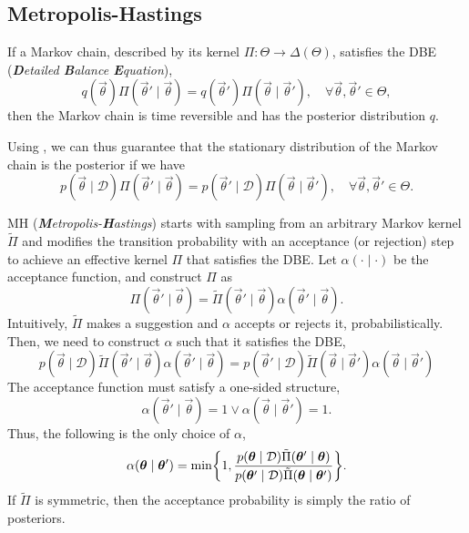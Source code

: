 \subsection{Metropolis-Hastings}

\begin{lemma} \label{lem:dbe}
    If a Markov chain, described by its kernel $\Pi: \Theta \to \Delta(\Theta)$, satisfies the DBE (\textit{\textbf{D}etailed \textbf{B}alance \textbf{E}quation}), \[
        q(\vec{\theta}) \Pi(\vec{\theta}' \mid \vec{\theta}) = q(\vec{\theta}') \Pi(\vec{\theta} \mid \vec{\theta}'), \quad \forall \vec{\theta}, \vec{\theta}' \in \Theta,
    \]
    then the Markov chain is time reversible and has the posterior distribution $q$.
\end{lemma}

Using , we can thus guarantee that the stationary distribution of the Markov chain is
the posterior if we have \[
    p(\vec{\theta} \mid \mathcal{D}) \Pi(\vec{\theta}' \mid \vec{\theta}) = p(\vec{\theta}' \mid \mathcal{D}) \Pi(\vec{\theta} \mid \vec{\theta}'), \quad \forall \vec{\theta}, \vec{\theta}' \in \Theta.
\]

MH (\textit{\textbf{M}etropolis-\textbf{H}astings}) starts with sampling from an arbitrary Markov
kernel $\tilde{\Pi}$ and modifies the transition probability with an acceptance (or rejection) step
to achieve an effective kernel $\Pi$ that satisfies the DBE. Let $\alpha(\cdot \mid \cdot)$ be the
acceptance function, and construct $\Pi$ as \[
    \Pi(\vec{\theta}' \mid \vec{\theta}) = \tilde{\Pi}(\vec{\theta}' \mid \vec{\theta}) \alpha(\vec{\theta}' \mid \vec{\theta}).
\]
Intuitively, $\tilde{\Pi}$ makes a suggestion and $\alpha$ accepts or rejects it,
probabilistically. Then, we need to construct $\alpha$ such that it satisfies the DBE, \[
    p(\vec{\theta}\mid \mathcal{D}) \tilde{\Pi}(\vec{\theta}' \mid \vec{\theta}) \alpha(\vec{\theta}' \mid \vec{\theta}) = p(\vec{\theta}' \mid \mathcal{D}) \tilde{\Pi}(\vec{\theta} \mid \vec{\theta}') \alpha(\vec{\theta} \mid \vec{\theta}')
\]
The acceptance function must satisfy a one-sided structure, \[
    \alpha(\vec{\theta}' \mid \vec{\theta}) = 1 \lor \alpha(\vec{\theta} \mid \vec{\theta}') = 1.
\]
Thus, the following is the only choice of $\alpha$, \[
    \alpha(\vec{\theta} \mid \vec{\theta}') = \min \lft\{ 1, \frac{p(\vec{\theta} \mid \mathcal{D}) \tilde{\Pi}(\vec{\theta}' \mid \vec{\theta})}{p(\vec{\theta}' \mid \mathcal{D}) \tilde{\Pi}(\vec{\theta} \mid \vec{\theta}')} \rgt\}.
\]
If $\tilde{\Pi}$ is symmetric, then the acceptance probability is simply the ratio of posteriors.

